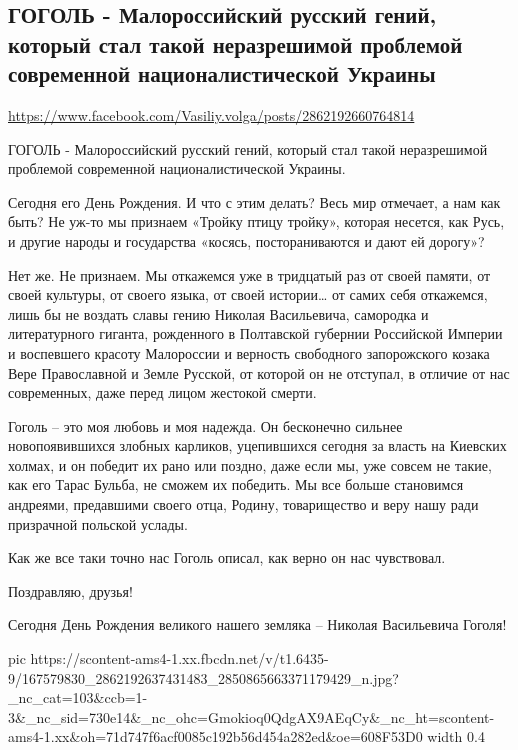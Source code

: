  
 
 
 
 

\subsection{ГОГОЛЬ - Малороссийский русский гений, который стал такой неразрешимой проблемой современной националистической Украины}
\label{sec:01_04_2021.fb.volga_vasilij.1.gogol}
\url{https://www.facebook.com/Vasiliy.volga/posts/2862192660764814}

ГОГОЛЬ - Малороссийский русский гений, который стал такой неразрешимой проблемой современной националистической Украины.

Сегодня его День Рождения. И что с этим делать? Весь мир отмечает, а нам как
быть? Не уж-то мы признаем «Тройку птицу тройку», которая несется, как Русь, и
другие народы и государства «косясь, постораниваются и дают ей дорогу»?

Нет же. Не признаем. Мы откажемся уже в тридцатый раз от своей памяти, от своей
культуры, от своего языка, от своей истории… от самих себя откажемся, лишь бы
не воздать славы гению Николая Васильевича, самородка и литературного гиганта,
рожденного в Полтавской губернии Российской Империи и воспевшего красоту
Малороссии и верность свободного запорожского козака Вере Православной и Земле
Русской, от которой он не отступал, в отличие от нас современных, даже перед
лицом жестокой смерти.

Гоголь – это моя любовь и моя надежда. Он бесконечно сильнее новопоявившихся
злобных карликов, уцепившихся сегодня за власть на Киевских холмах, и он
победит их рано или поздно, даже если мы, уже совсем не такие, как его Тарас
Бульба, не сможем их победить. Мы все больше становимся андреями, предавшими
своего отца, Родину, товарищество и веру нашу ради призрачной польской услады.

Как же все таки точно нас Гоголь описал, как верно он нас чувствовал.

Поздравляю, друзья! 

Сегодня День Рождения великого нашего земляка – Николая Васильевича Гоголя!


\ifcmt
  pic https://scontent-ams4-1.xx.fbcdn.net/v/t1.6435-9/167579830_2862192637431483_2850865663371179429_n.jpg?_nc_cat=103&ccb=1-3&_nc_sid=730e14&_nc_ohc=Gmokioq0QdgAX9AEqCy&_nc_ht=scontent-ams4-1.xx&oh=71d747f6acf0085c192b56d454a282ed&oe=608F53D0
  width 0.4
\fi

